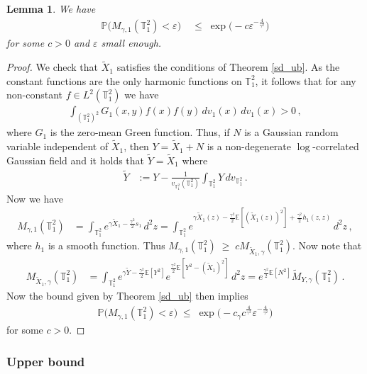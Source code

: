 \documentclass[11pt]{article}
\numberwithin{equation}{section}
\newtheorem{lemma}[theorem]{Lemma}
\theoremstyle{definition}
\renewcommand{\tilde}{\widetilde}          %
\renewcommand{\leq}{\;\leqslant\;}                   %
\renewcommand{\geq}{\;\geqslant\;}                   %
\newcommand{\E}{\mathbb{E}}
\renewcommand{\P}{\mathbb{P}}
\def\eps{\varepsilon}
\def\T{\mathbb{T}}
\newcommand{\grea}{>}
\newcommand{\Pb}{\P}
\newcommand{\tor}{{\T_1^2}}
\begin{document}
\begin{lemma}\label{lem:product_gmc}
We have
	\begin{align*}
	\Pb \big( M_{\gamma,1}(\tor) \less \eps \big) & \leq \exp \big(- c \eps^{- \frac{4}{\gamma^2}} \big)
	\end{align*}
	for some $c>0$ and $\eps$ small enough.
\end{lemma}
	\begin{proof} We check that $\tilde X_1$ satisfies the conditions of Theorem \ref{sd_ub}. As the constant functions are the only harmonic functions on $\tor$, it follows that for any non-constant $f \in L^2(\tor)$ we have
	\begin{align*}
	\int_{(\tor)^2} G_1(x,y) f(x) f(y) \,dv_1(x) \, dv_1(x) \grea 0\,,
	\end{align*}	
	where $G_1$ is the zero-mean Green function. Thus, if $N$ is a Gaussian random variable independent of $\tilde X_1$, then $Y = \tilde X_1 + N$ is a non-degenerate $\log$-correlated Gaussian field and it holds that $\tilde Y = \tilde X_1$ where
	\begin{align*}
	\tilde Y &:= Y  - \tfrac{1}{v_\tor(\tor)}\int_\tor Y \, dv_\tor\,.
	\end{align*}
	Now we have
	\begin{align*}
	M_{\gamma,1}(\tor) &= \int_{\tor} e^{\gamma \tilde X_1 - \frac{\gamma^2}{2} s_1} \, d^2z = \int_{\tor} e^{\gamma \tilde X_1(z) - \frac{\gamma^2}{2} \E[ (\tilde X_1(z))^2] + \frac{\gamma^2}{2} h_1(z,z)} \, d^2z  \,,
	\end{align*}
	where $h_1$ is a smooth function. Thus $M_{\gamma,1}(\tor) \geq c M_{\tilde X_1, \gamma}(\tor)$. Now note that 
	\begin{align*}
	M_{\tilde X_1,\gamma}(\tor) &= \int_\tor e^{\gamma \tilde Y - \frac{\gamma^2}{2} \E[Y^2]} e^{ \frac{\gamma^2}{2} \E[ Y^2 - (\tilde X_1)^2 ]  } \, d^2z  = e^{ \frac{\gamma^2}{2} \E[N^2]} \tilde M_{Y,\gamma}(\tor)\,. 
	\end{align*}
	Now the bound given by Theorem \ref{sd_ub} then implies
	\begin{align*}
	\P \big( M_{\gamma,1}(\tor) < \eps \big) \leq \exp \big( - c_\gamma c^{ \frac{4}{\gamma^2}} \eps^{- \frac{4}{\gamma^2}} \big)
	\end{align*}
	for some $c>0$.
	
	\end{proof}
	




\subsubsection{Upper bound}
\end{document}
